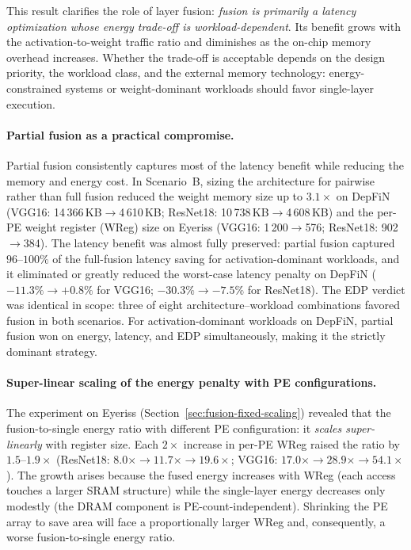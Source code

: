 This result clarifies the role of layer fusion:
\emph{fusion is primarily a latency optimization whose energy
trade-off is workload-dependent}.
Its benefit grows with the activation-to-weight traffic ratio and
diminishes as the on-chip memory overhead increases.
Whether the trade-off is acceptable depends on the design priority,
the workload class, and the external memory technology:
energy-constrained
systems or weight-dominant workloads should favor single-layer
execution.

\paragraph{Partial fusion as a practical compromise.}
Partial fusion consistently captures most of the latency benefit
while reducing the memory and energy cost.
In Scenario~B, sizing the architecture for pairwise rather than
full fusion reduced the weight memory size up to $3.1\times$ on DepFiN
(VGG16: 14\,366\,KB${\to}$4\,610\,KB; ResNet18:
10\,738\,KB${\to}$4\,608\,KB) and the per-PE weight register (WReg)  size on Eyeriss
(VGG16: 1\,200${\to}$576; ResNet18: 902${\to}$384).
The latency benefit was almost fully preserved: partial fusion
captured $96$--$100\%$ of the full-fusion latency saving for
activation-dominant workloads, and it eliminated or greatly reduced
the worst-case latency penalty on DepFiN
($-11.3\% \to +0.8\%$ for VGG16; $-30.3\% \to -7.5\%$ for
ResNet18).
The EDP verdict was identical in scope: three of eight
architecture--workload combinations favored fusion in both
scenarios.
For activation-dominant workloads on DepFiN, partial fusion
won on energy, latency, and EDP simultaneously, making it the
strictly dominant strategy.

\paragraph{Super-linear scaling of the energy penalty with PE configurations.}
The experiment on Eyeriss
(Section~\ref{sec:fusion-fixed-scaling}) revealed that the
fusion-to-single energy ratio with different PE configuration: it
\emph{scales super-linearly} with register size.
Each $2\times$ increase in per-PE WReg raised the ratio by
$1.5$--$1.9\times$ (ResNet18: $8.0\times \to 11.7\times \to
19.6\times$; VGG16: $17.0\times \to 28.9\times \to 54.1\times$).
The growth arises because the fused energy increases with WReg
(each access touches a larger SRAM structure) while the
single-layer energy decreases only modestly (the DRAM component is
PE-count-independent).
Shrinking the PE array to save area will face a
proportionally larger WReg and, consequently, a worse
fusion-to-single energy ratio.



